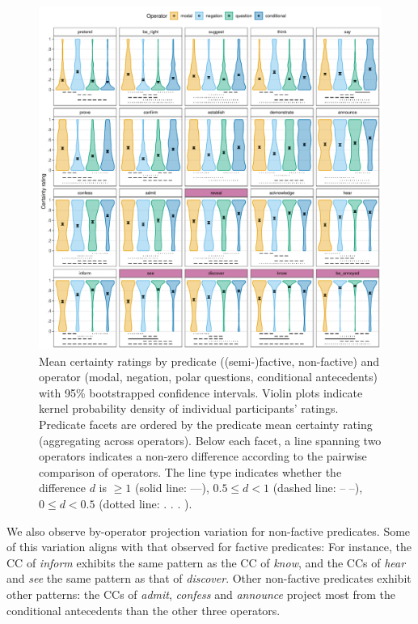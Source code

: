 \documentclass[a4paper,12pt,twoside]{article}
\begin{document}
         \begin{figure}[ht!]
            \centering
    		\includegraphics[width = .9\linewidth]{analysis.pdf}
    		\caption{Mean certainty ratings by predicate (\textcolor{pred-fcv-color}{(semi-)factive}, non-factive) and operator (\textcolor{op-m-color}{modal},  \textcolor{op-n-color}{negation}, \textcolor{op-q-color}{polar questions}, \textcolor{op-c-color}{conditional antecedents}) with 95\% bootstrapped confidence intervals. Violin plots indicate kernel probability density of individual participants' ratings. Predicate facets are ordered by the predicate mean certainty rating (aggregating across operators). Below each facet, a line spanning two operators indicates a non-zero difference according to the pairwise comparison of operators. The line type indicates whether the difference $d$ is $\geq 1$ (solid line: —), $0.5 \le d < 1$ (dashed line: – –), $0 \le d < 0.5$ (dotted line: . . . ).}
    		\label{fig:op-pred-analysis}
    	\end{figure}

        
        
    

        We also observe by-operator projection variation for non-factive predicates. Some of this variation aligns with that observed for factive predicates: For instance, the CC of \emph{inform} exhibits the same pattern as the CC of \emph{know}, and the CCs of \emph{hear} and \emph{see} the same pattern as that of \emph{discover}. Other non-factive predicates exhibit other patterns: the CCs of \emph{admit}, \emph{confess} and \emph{announce} project most from the conditional antecedents than the other three operators. 
\end{document}
